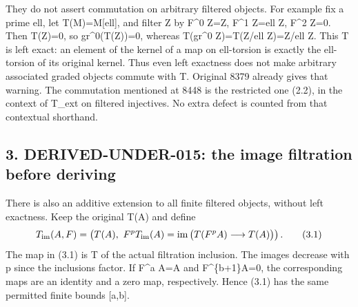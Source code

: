 They do not assert commutation on arbitrary filtered objects. For example fix a prime ell,\allowbreak{} let T(M)\allowbreak{}\allowbreak{}=M[ell]\allowbreak{},\allowbreak{} and filter Z by F\^{}0 Z\allowbreak{}=Z,\allowbreak{} F\^{}1 Z\allowbreak{}=ell Z,\allowbreak{} F\^{}2 Z\allowbreak{}=0. Then T(Z)\allowbreak{}\allowbreak{}=0,\allowbreak{} so gr\textasciicircum{}0(T(Z)\allowbreak{})\allowbreak{}\allowbreak{}=0,\allowbreak{} whereas T(gr\^{}0 Z)\allowbreak{}\allowbreak{}=T(Z/\allowbreak{}ell Z)\allowbreak{}\allowbreak{}=Z/\allowbreak{}ell Z. This T is left exact:\allowbreak{} an element of the kernel of a map on ell-torsion is exactly the ell-torsion of its original kernel. Thus even left exactness does not make arbitrary associated graded objects commute with T. Original 8379 already gives that warning. The commutation mentioned at 8448 is the restricted one (2.2)\allowbreak{},\allowbreak{} in the context of T\_\allowbreak{}ext on filtered injectives. No extra defect is counted from that contextual shorthand.

\subsection{\texorpdfstring{3. DERIVED-UNDER-015:\allowbreak{} the image filtration before deriving}{3.  the image filtration before deriving}}\label{proofs-8352-8772-derived-under-015-the-image-filtration-before-deriving}

There is also an additive extension to all finite filtered objects,\allowbreak{} without left exactness. Keep the original T(A)\allowbreak{} and define \[
 T_{\rm im}(A,F)=
 \left(T(A),\
 F^pT_{\rm im}(A)=
 \operatorname{im}\big(T(F^pA)\longrightarrow T(A)\big)\right).
                                                               \tag{3.1}
\] The map in (3.1)\allowbreak{} is T of the actual filtration inclusion. The images decrease with p since the inclusions factor. If F\^{}a A\allowbreak{}=A and F\textasciicircum{}\{b\allowbreak{}+1\}A\allowbreak{}=0,\allowbreak{} the corresponding maps are an identity and a zero map,\allowbreak{} respectively. Hence (3.1)\allowbreak{} has the same permitted finite bounds [a,\allowbreak{}b]\allowbreak{}.

